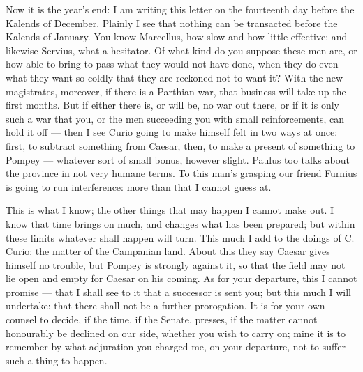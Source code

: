  Now it is the year's end: I am writing this letter on the fourteenth day before the Kalends of December. Plainly I see that nothing can be transacted before the Kalends of January. You know Marcellus, how slow and how little effective; and likewise Servius, what a hesitator. Of what kind do you suppose these men are, or how able to bring to pass what they would not have done, when they do even what they want so coldly that they are reckoned not to want it? With the new magistrates, moreover, if there is a Parthian war, that business will take up the first months. But if either there is, or will be, no war out there, or if it is only such a war that you, or the men succeeding you with small reinforcements, can hold it off --- then I see Curio going to make himself felt in two ways at once: first, to subtract something from Caesar, then, to make a present of something to Pompey --- whatever sort of small bonus, however slight. Paulus too talks about the province in not very humane terms. To this man's grasping our friend Furnius is going to run interference: more than that I cannot guess at.

 This is what I know; the other things that may happen I cannot make out. I know that time brings on much, and changes what has been prepared; but within these limits whatever shall happen will turn. This much I add to the doings of C. Curio: the matter of the Campanian land. About this they say Caesar gives himself no trouble, but Pompey is strongly against it, so that the field may not lie open and empty for Caesar on his coming. As for your departure, this I cannot promise --- that I shall see to it that a successor is sent you; but this much I will undertake: that there shall not be a further prorogation. It is for your own counsel to decide, if the time, if the Senate, presses, if the matter cannot honourably be declined on our side, whether you wish to carry on; mine it is to remember by what adjuration you charged me, on your departure, not to suffer such a thing to happen.
